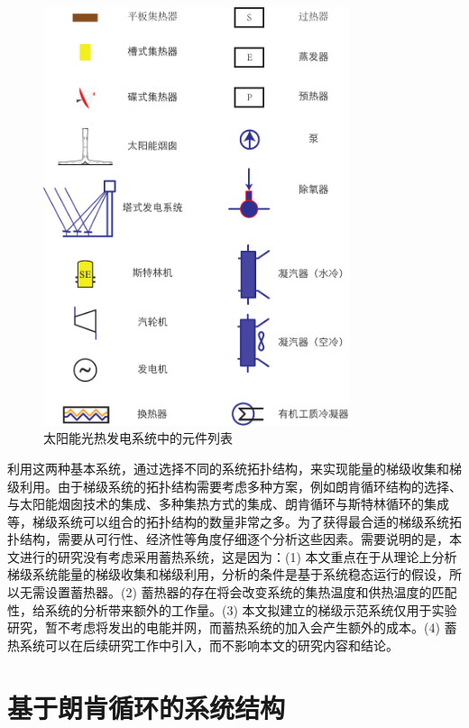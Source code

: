 \begin{figure}[htbp]
\centering
\includegraphics[width=0.8\textwidth]{fig/Legends.pdf}
\caption{太阳能光热发电系统中的元件列表}
\label{fig:Legends}
\end{figure}

利用这两种基本系统，通过选择不同的系统拓扑结构，来实现能量的梯级收集和梯级利用。由于梯级系统的拓扑结构需要考虑多种方案，例如朗肯循环结构的选择、与太阳能烟囱技术的集成、多种集热方式的集成、朗肯循环与斯特林循环的集成等，梯级系统可以组合的拓扑结构的数量非常之多。为了获得最合适的梯级系统拓扑结构，需要从可行性、经济性等角度仔细逐个分析这些因素。需要说明的是，本文进行的研究没有考虑采用蓄热系统，这是因为：(1) 本文重点在于从理论上分析梯级系统能量的梯级收集和梯级利用，分析的条件是基于系统稳态运行的假设，所以无需设置蓄热器。(2) 蓄热器的存在将会改变系统的集热温度和供热温度的匹配性，给系统的分析带来额外的工作量。(3) 本文拟建立的梯级示范系统仅用于实验研究，暂不考虑将发出的电能并网，而蓄热系统的加入会产生额外的成本。(4) 蓄热系统可以在后续研究工作中引入，而不影响本文的研究内容和结论。

\section{基于朗肯循环的系统结构}
\label{sec:RankineCycleBased}

